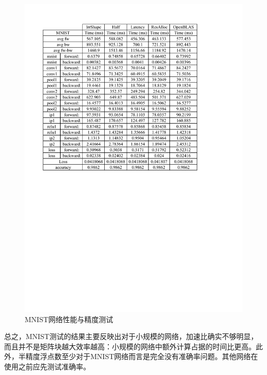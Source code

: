\begin{figure}[!ht]
	\centering	
	\includegraphics[width=\textwidth]{assets/imgs/mnist.pdf}
	\caption{MNIST网络性能与精度测试}
	\label{fig:mnist}
\end{figure}

总之，MNIST测试的结果主要反映出对于小规模的网络，加速比确实不够明显，而且并不是矩阵块越大效率越高：小规模的网络中额外计算占据的时间比更高。此外，半精度浮点数至少对于MNIST网络而言是完全没有准确率问题。其他网络在使用之前应先测试准确率。